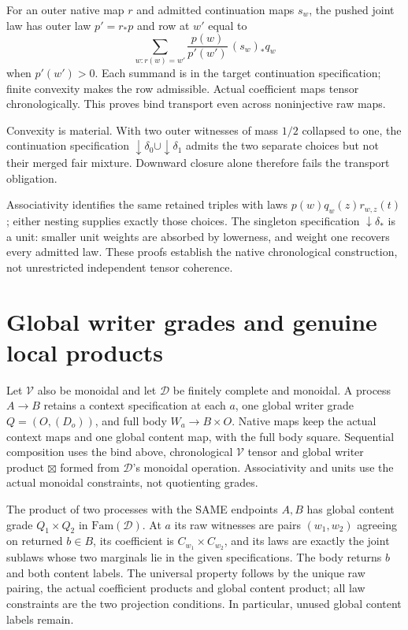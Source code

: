 \documentclass{article}
\begin{document}
For an outer native map $r$ and admitted continuation maps $s_w$, the pushed joint law has outer law $p'=r_*p$ and row at $w'$ equal to
\[\sum_{w:r(w)=w'}\frac{p(w)}{p'(w')}\,(s_w)_*q_w\]
when $p'(w')>0$. Each summand is in the target continuation specification; finite convexity makes the row admissible. Actual coefficient maps tensor chronologically. This proves bind transport even across noninjective raw maps.

Convexity is material. With two outer witnesses of mass $1/2$ collapsed to one, the continuation specification $\downarrow\delta_0\cup\downarrow\delta_1$ admits the two separate choices but not their merged fair mixture. Downward closure alone therefore fails the transport obligation.

Associativity identifies the same retained triples with laws $p(w)q_w(z)r_{w,z}(t)$; either nesting supplies exactly those choices. The singleton specification $\downarrow\delta_*$ is a unit: smaller unit weights are absorbed by lowerness, and weight one recovers every admitted law. These proofs establish the native chronological construction, not unrestricted independent tensor coherence.
\section{Global writer grades and genuine local products}
Let $\mathcal V$ also be monoidal and let $\mathcal D$ be finitely complete and monoidal. A process $A\to B$ retains a context specification at each $a$, one global writer grade $Q=(O,(D_o))$, and full body $W_a\to B\times O$. Native maps keep the actual context maps and one global content map, with the full body square. Sequential composition uses the bind above, chronological $\mathcal V$ tensor and global writer product $\boxtimes$ formed from $\mathcal D$'s monoidal operation. Associativity and units use the actual monoidal constraints, not quotienting grades.

The product of two processes with the SAME endpoints $A,B$ has global content grade $Q_1\times Q_2$ in $\mathrm{Fam}(\mathcal D)$. At $a$ its raw witnesses are pairs $(w_1,w_2)$ agreeing on returned $b\in B$, its coefficient is $C_{w_1}\times C_{w_2}$, and its laws are exactly the joint sublaws whose two marginals lie in the given specifications. The body returns $b$ and both content labels. The universal property follows by the unique raw pairing, the actual coefficient products and global content product; all law constraints are the two projection conditions. In particular, unused global content labels remain.
\end{document}
